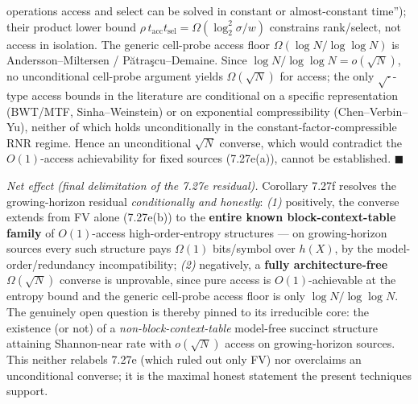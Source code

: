 \documentclass[
]{article}
\begin{document}
operations access and select can be solved in constant or almost-constant
time''); their product lower bound $\rho\,t_{\mathrm{acc}}t_{\mathrm{sel}}
= \Omega(\log_2^2\sigma/w)$ constrains rank/select, not access in
isolation. The generic cell-probe access floor $\Omega(\log N/\log\log N)$
is Andersson--Miltersen / P\u{a}tra\c{s}cu--Demaine. Since $\log N/\log
\log N = o(\sqrt N)$, no unconditional cell-probe argument yields
$\Omega(\sqrt N)$ for access; the only $\sqrt{\cdot}$-type access bounds in
the literature are conditional on a specific representation (BWT/MTF,
Sinha--Weinstein) or on exponential compressibility (Chen--Verbin--Yu),
neither of which holds unconditionally in the constant-factor-compressible
RNR regime. Hence an unconditional $\sqrt N$ converse, which would
contradict the $O(1)$-access achievability for fixed sources (7.27e(a)),
cannot be established. \hfill$\blacksquare$

\emph{Net effect (final delimitation of the 7.27e residual).} Corollary
7.27f resolves the growing-horizon residual \emph{conditionally and
honestly}: \emph{(1)} positively, the converse extends from FV alone
(7.27e(b)) to the \textbf{entire known block-context-table family} of
$O(1)$-access high-order-entropy structures --- on growing-horizon
sources every such structure pays $\Omega(1)$ bits/symbol over $h(X)$, by
the model-order/redundancy incompatibility; \emph{(2)} negatively, a
\textbf{fully architecture-free} $\Omega(\sqrt N)$ converse is unprovable,
since pure access is $O(1)$-achievable at the entropy bound and the
generic cell-probe access floor is only $\log N/\log\log N$. The genuinely
open question is thereby pinned to its irreducible core: the existence (or
not) of a \emph{non-block-context-table} model-free succinct structure
attaining Shannon-near rate with $o(\sqrt N)$ access on growing-horizon
sources. This neither relabels 7.27e (which ruled out only FV) nor
overclaims an unconditional converse; it is the maximal honest statement
the present techniques support.
\end{document}
